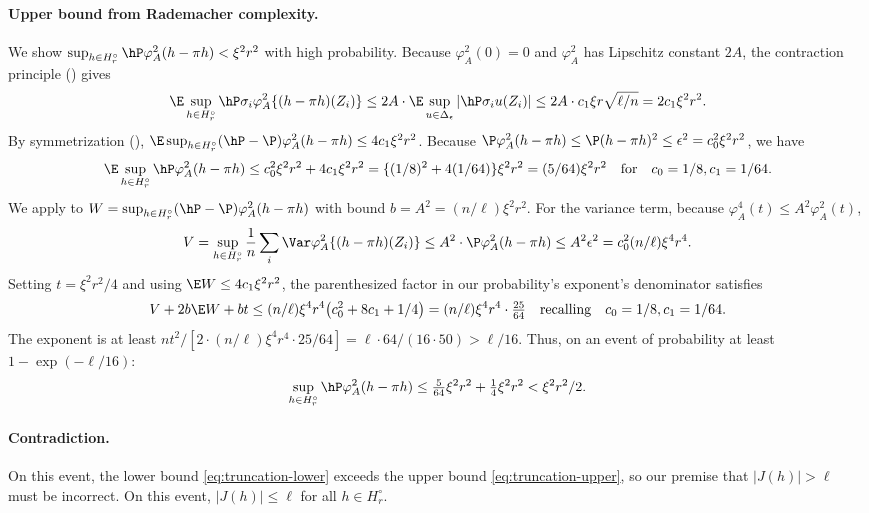 \documentclass{article}
\begin{document}
\paragraph{Upper bound from Rademacher complexity.} We show $\sup_{h \in H_r^\circ} \hP \varphi_A^2(h - \pi h) < \xi^2 r^2$ with high probability. Because $\varphi_A^2(0) = 0$ and $\varphi_A^2$ has Lipschitz constant $2A$, the contraction principle () gives
\[
\E \sup_{h \in H_r^\circ} \hP \sigma_i \varphi_A^2\{(h - \pi h)(Z_i)\} \le 2A \cdot \E \sup_{u \in \Delta_\epsilon} |\hP \sigma_i u(Z_i)| \le 2A \cdot c_1 \xi r \sqrt{\ell/n} = 2 c_1 \xi^2 r^2.
\]
By symmetrization (), $\E \sup_{h \in H_r^\circ} (\hP - \P)\varphi_A^2(h - \pi h) \le 4 c_1 \xi^2 r^2$. Because $\P\varphi_A^2(h - \pi h) \le \P(h - \pi h)^2 \le \epsilon^2 = c_0^2 \xi^2 r^2$, we have
\[
\E\sup_{h \in H_r^\circ} \hP \varphi_A^2(h - \pi h) \le c_0^2 \xi^2 r^2 + 4c_1 \xi^2 r^2 = \{(1/8)^2 + 4(1/64)\}\xi^2r^2 = (5/64)\xi^2 r^2 \qfor c_0 = 1/8, c_1 = 1/64.
\]
We apply  to $W = \sup_{h \in H_r^\circ} (\hP - \P)\varphi_A^2(h - \pi h)$ with bound $b = A^2 = (n/\ell)\xi^2 r^2$. For the variance term, because $\varphi_A^4(t) \le A^2 \varphi_A^2(t)$,
\[
V = \sup_{h \in H_r^\circ} \frac{1}{n}\sum_i \Var \varphi_A^2\{(h-\pi h)(Z_i)\} \le A^2 \cdot \P\varphi_A^2(h-\pi h) \le A^2 \epsilon^2 = c_0^2 (n/\ell) \xi^4 r^4.
\]
Setting $t = \xi^2 r^2/4$ and using $\E W \le 4c_1 \xi^2 r^2$, the parenthesized factor in our probability's exponent's denominator satisfies
\[
V + 2b\E W + bt \le (n/\ell)\xi^4 r^4 \qty(c_0^2 + 8c_1 + 1/4) = (n/\ell)\xi^4 r^4 \cdot \tfrac{25}{64} \qqtext{recalling} c_0 = 1/8, c_1 = 1/64.
\]
 The exponent is at least $nt^2 / [2 \cdot (n/\ell)\xi^4 r^4 \cdot 25/64] = \ell \cdot 64/(16 \cdot 50) > \ell/16$. Thus, on an event of probability at least $1 - \exp(-\ell/16)$:
\begin{equation}\label{eq:truncation-upper}
\sup_{h \in H_r^\circ} \hP \varphi_A^2(h - \pi h) \le \tfrac{5}{64}\xi^2 r^2 + \tfrac{1}{4}\xi^2 r^2 < \xi^2 r^2/2.
\end{equation}

\paragraph{Contradiction.} On this event, the lower bound \eqref{eq:truncation-lower} exceeds the upper bound \eqref{eq:truncation-upper}, so our premise that $|J(h)| > \ell$
must be incorrect. On this event, $|J(h)| \le \ell$ for all $h \in H_r^\circ$.
\end{document}
